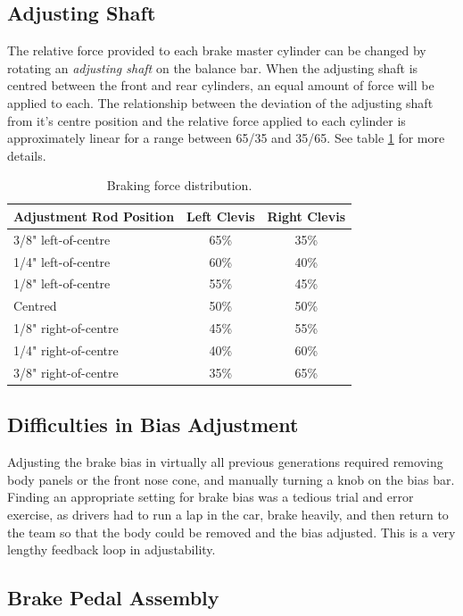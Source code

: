 \subsection{Adjusting Shaft}

The relative force provided to each brake master cylinder can be changed by rotating an \emph{adjusting shaft} on the balance bar. When the adjusting shaft is centred between the front and rear cylinders, an equal amount of force will be applied to each. The relationship between the deviation of the adjusting shaft from it's centre position and the relative force applied to each cylinder is approximately linear for a range between 65/35 and 35/65. See table \ref{table:bb_force_distribution} for more details.

\begin{table}[H]
	\centering
	\caption{Braking force distribution.}
	\label{table:bb_force_distribution}	
	\begin{tabular}{| l | c | c |}
		\hline Adjustment Rod Position & Left Clevis & Right Clevis  \\ \hline
		\hline 3/8" left-of-centre & 65\% & 35\% \\ 
		\hline 1/4" left-of-centre & 60\% & 40\% \\
		\hline 1/8" left-of-centre & 55\% & 45\% \\
		\hline Centred & 50\% & 50\% \\
		\hline 1/8" right-of-centre & 45\% & 55\% \\
		\hline 1/4" right-of-centre & 40\% & 60\% \\
		\hline 3/8" right-of-centre & 35\% & 65\% \\
		\hline
	\end{tabular}
\end{table}

\subsection{Difficulties in Bias Adjustment}

Adjusting the brake bias in virtually all previous generations required removing body panels or the front nose cone, and manually turning a knob on the bias bar. Finding an appropriate setting for brake bias was a tedious trial and error exercise, as drivers had to run a lap in the car, brake heavily, and then return to the team so that the body could be removed and the bias adjusted. This is a very lengthy feedback loop in adjustability.

\subsection{Brake Pedal Assembly}

